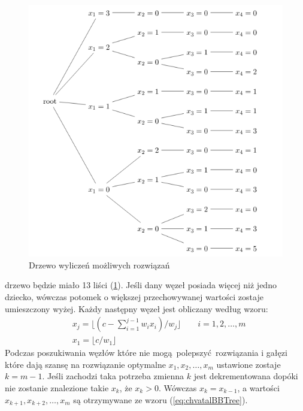 \begin{figure}
  \includegraphics[width=\textwidth,center]{../image/chvatal_book_sample.png}%
  \caption{Drzewo wyliczeń możliwych rozwiązań}
  \label{fig:chvatalBBTree}
\end{figure}
drzewo będzie miało 13 liści (\cref{fig:chvatalBBTree}). Jeśli dany węzeł posiada więcej niż jedno dziecko, wówczas potomek o większej przechowywanej wartości zostaje umieszczony wyżej. Każdy następny węzeł jest obliczany według wzoru:
\begin{equation*}\label{eq:chvatalBBTree}
  \begin{aligned}
    & x_j = \lfloor{(c - \sum_{i=1}^{j-1}w_ix_i)/w_j}\rfloor \qquad i = 1,2,\dots,m \\
    & x_1 = \lfloor{c/w_1}\rfloor
  \end{aligned}
\end{equation*}
Podczas poszukiwania węzłów które nie mogą polepszyć rozwiązania i gałęzi które dają szansę na rozwiązanie optymalne $x_1,x_2,\dots,x_m$ ustawione zostaje $k = m-1$. Jeśli zachodzi taka potrzeba zmienna $k$ jest dekrementowana dopóki nie zostanie znalezione takie $x_k$, że $x_k > 0$. Wówczas $x_k = x_{k-1}$, a wartości $x_{k+1}, x_{k+2}, \dots,x_m$ są otrzymywane ze wzoru (\cref{eq:chvatalBBTree}).


